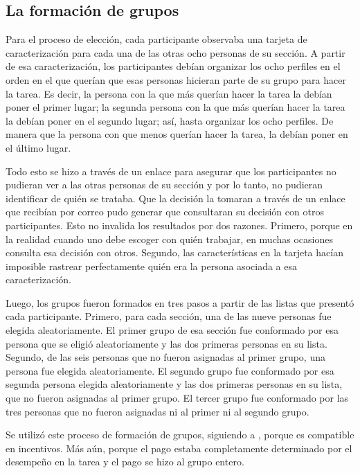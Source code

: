 \subsection{La formación de grupos}
Para el proceso de elección, cada participante observaba una tarjeta de caracterización para cada una de las otras ocho personas de su sección. A partir de esa caracterización, los participantes debían organizar los ocho perfiles en el orden en el que querían que esas personas hicieran parte de su grupo para hacer la tarea. Es decir, la persona con la que más querían hacer la tarea la debían poner el primer lugar; la segunda persona con la que más querían hacer la tarea la debían poner en el segundo lugar; así, hasta organizar los ocho perfiles. De manera que la persona con que menos querían hacer la tarea, la debían poner en el último lugar.

Todo esto se hizo a través de un enlace para asegurar que los participantes no pudieran ver a las otras personas de su sección y por lo tanto, no pudieran identificar de quién se trataba. Que la decisión la tomaran a través de un enlace que recibían por correo pudo generar que consultaran su decisión con otros participantes. Esto no invalida los resultados por dos razones. Primero, porque en la realidad cuando uno debe escoger con quién trabajar, en muchas ocasiones consulta esa decisión con otros. Segundo, las características en la tarjeta hacían imposible rastrear perfectamente quién era la persona asociada a esa caracterización.

Luego, los grupos fueron formados en tres pasos a partir de las listas que presentó cada participante. Primero, para cada sección, una de las nueve personas fue elegida aleatoriamente. El primer grupo de esa sección fue conformado por esa persona que se eligió aleatoriamente y las dos primeras personas en su lista. Segundo, de las seis personas que no fueron asignadas al primer grupo, una persona fue elegida aleatoriamente. El segundo grupo fue conformado por esa segunda persona elegida aleatoriamente y las dos primeras personas en su lista, que no fueron asignadas al primer grupo. El tercer grupo fue conformado por las tres personas que no fueron asignadas ni al primer ni al segundo grupo.

Se utilizó este proceso de formación de grupos, siguiendo a \cite{beautifulorwhite2012}, porque es compatible en incentivos. Más aún, porque el pago estaba completamente determinado por el desempeño en la tarea y el pago se hizo al grupo entero.


